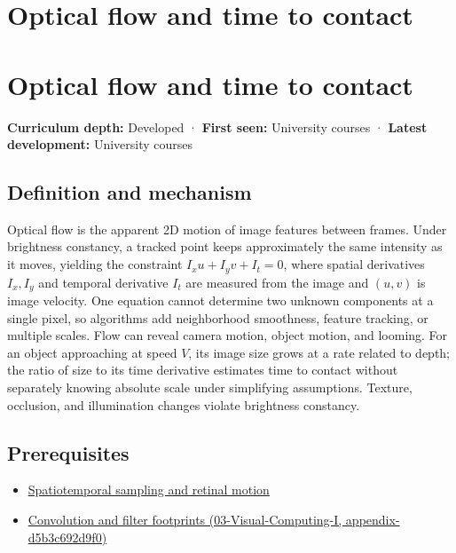 \hypertarget{appendix-e2e73f8cd93e}{}
\section*{Optical flow and time to contact}
\section{Optical flow and time to contact}\label{appendix-e2e73f8cd93e-optical-flow-and-time-to-contact}

\textbf{Curriculum depth:} Developed · \textbf{First seen:} University courses · \textbf{Latest development:} University courses

\subsection{Definition and mechanism}\label{appendix-e2e73f8cd93e-definition-and-mechanism}

Optical flow is the apparent 2D motion of image features between frames. Under brightness constancy, a tracked point keeps approximately the same intensity as it moves, yielding the constraint \(I_xu+I_yv+I_t=0\), where spatial derivatives \(I_x,I_y\) and temporal derivative \(I_t\) are measured from the image and \((u,v)\) is image velocity. One equation cannot determine two unknown components at a single pixel, so algorithms add neighborhood smoothness, feature tracking, or multiple scales. Flow can reveal camera motion, object motion, and looming. For an object approaching at speed \(V\), its image size grows at a rate related to depth; the ratio of size to its time derivative estimates time to contact without separately knowing absolute scale under simplifying assumptions. Texture, occlusion, and illumination changes violate brightness constancy.

\subsection{Prerequisites}\label{appendix-e2e73f8cd93e-prerequisites}

\begin{itemize}
\tightlist
\item
  \hyperref[appendix-70895739febb]{Spatiotemporal sampling and retinal motion}
\item
  \href{../03-Visual-Computing-I/main.pdf\#nameddest=appendix-d5b3c692d9f0}{Convolution and filter footprints (03-Visual-Computing-I, appendix-d5b3c692d9f0)}
\end{itemize}

